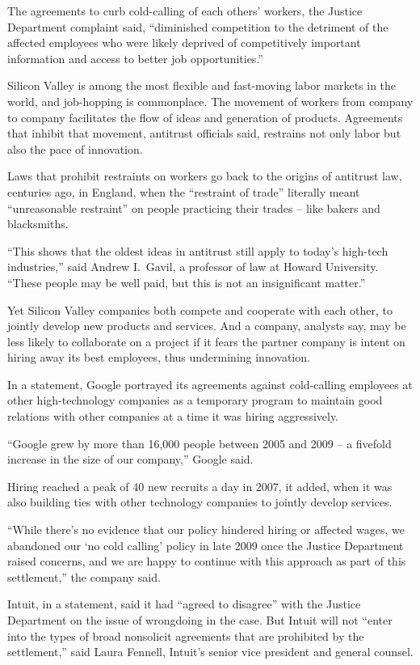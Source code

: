 ﻿\documentclass[12pt]{article}
\begin{document}
The agreements to curb cold-calling of each others' workers, the Justice Department complaint said,
``diminished competition to the detriment of the affected employees who were likely deprived of
competitively important information and access to better job opportunities.''

Silicon Valley is among the most flexible and fast-moving labor markets in the world, and
job-hopping is commonplace. The movement of workers from company to company facilitates the flow of
ideas and generation of products. Agreements that inhibit that movement, antitrust officials said,
restrains not only labor but also the pace of innovation.

Laws that prohibit restraints on workers go back to the origins of antitrust law, centuries ago, in
England, when the ``restraint of trade'' literally meant ``unreasonable restraint'' on people
practicing their trades -- like bakers and blacksmiths.

``This shows that the oldest ideas in antitrust still apply to today's high-tech industries,'' said
Andrew I.~Gavil, a professor of law at Howard University. ``These people may be well paid, but this
is not an insignificant matter.''

Yet Silicon Valley companies both compete and cooperate with each other, to jointly develop new
products and services. And a company, analysts say, may be less likely to collaborate on a project
if it fears the partner company is intent on hiring away its best employees, thus undermining
innovation.

In a statement, Google portrayed its agreements against cold-calling employees at other
high-technology companies as a temporary program to maintain good relations with other companies at
a time it was hiring aggressively.

``Google grew by more than 16,000 people between 2005 and 2009 -- a fivefold increase in the size of
our company,'' Google said.

Hiring reached a peak of 40 new recruits a day in 2007, it added, when it was also building ties
with other technology companies to jointly develop services.

``While there's no evidence that our policy hindered hiring or affected wages, we abandoned our `no
cold calling' policy in late 2009 once the Justice Department raised concerns, and we are happy to
continue with this approach as part of this settlement,'' the company said.

Intuit, in a statement, said it had ``agreed to disagree'' with the Justice Department on the issue
of wrongdoing in the case. But Intuit will not ``enter into the types of broad nonsolicit agreements
that are prohibited by the settlement,'' said Laura Fennell, Intuit's senior vice president and
general counsel.
\end{document}
